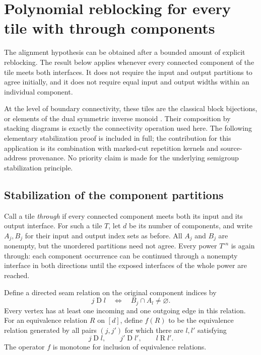 
\section{Polynomial reblocking for every tile with through components}
\label{sec:through-reblocking}

The alignment hypothesis can be obtained after a bounded amount of explicit
reblocking.  The result below applies whenever every connected component of
the tile meets both interfaces.  It does not require the input and output
partitions to agree initially, and it does not require equal input and output
widths within an individual component.

At the level of boundary connectivity, these tiles are the classical block
bijections, or elements of the dual symmetric inverse monoid
\cite{fitzgerald-leech1998,easdown-east-fitzgerald2008}.  Their composition by
stacking diagrams is exactly the connectivity operation used here.  The
following elementary stabilization proof is included in full; the contribution
for this application is its combination with marked-cut repetition kernels
and source-address provenance.  No priority claim is made for the underlying
semigroup stabilization principle.

\subsection{Stabilization of the component partitions}

Call a tile \emph{through} if every connected component meets both its input
and its output interface.  For such a tile $T$, let $d$ be its number of
components, and write $A_j,B_j$ for their input and output index sets as before.
All $A_j$ and $B_j$ are nonempty, but the unordered partitions need not agree.
Every power $T^{\circ n}$ is again through: each component occurrence can be
continued through a nonempty interface in both directions until the exposed
interfaces of the whole power are reached.

Define a directed seam relation on the original component indices by
\[
 j\mathrel D l \quad\Longleftrightarrow\quad B_j\cap A_l\ne\varnothing.
\]
Every vertex has at least one incoming and one outgoing edge in this relation.
For an equivalence relation $R$ on $[d]$, define $f(R)$ to be the equivalence
relation generated by all pairs $(j,j')$ for which there are $l,l'$ satisfying
\[
 j\mathrel D l,\qquad j'\mathrel D l',\qquad l\mathrel R l'.
\]
The operator $f$ is monotone for inclusion of equivalence relations.

